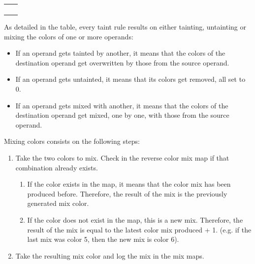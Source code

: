 \documentclass[conference]{IEEEtran}
\begin{document}
\begin{table}[htbp]
\begin{center}
\begin{tabular}{|>{\centering\arraybackslash}p{2cm}|>{\centering\arraybackslash}p{5.5cm}|}
                                      &                       \\
                                      &                       \\
                                      &                     \\
                                      &                     \\
            \hline
        \end{tabular}
        \label{tab1}
    \end{center}
    \label{table:instruction_types_instrumentation_supported}
\end{table}

As detailed in the table, every taint rule results on either tainting, untainting or mixing the colors of one or more operands:
\begin{itemize}
    \item If an operand gets tainted by another, it means that the colors of the destination
    operand get overwritten by those from the source operand.
    \item If an operand gets untainted, it means that its colors get removed, all set to 0.
    \item If an operand gets mixed with another, it means that the colors of the destination
    operand get mixed, one by one, with those from the source operand.
\end{itemize}

Mixing colors consists on the following steps:
\begin{enumerate}
    \item Take the two colors to mix. Check in the reverse color mix map if that combination already exists.
        \begin{enumerate}
            \item If the color exists in the map, it means that the color mix has been produced before.
            Therefore, the result of the mix is the previously generated mix color.
            \item If the color does not exist in the map, this is a new mix. Therefore, the result of the mix
            is equal to the latest color mix produced + 1. (e.g. if the last mix was color 5, then the new mix is color 6).
        \end{enumerate}
    \item Take the resulting mix color and log the mix in the mix maps.
\end{enumerate}
\end{document}
